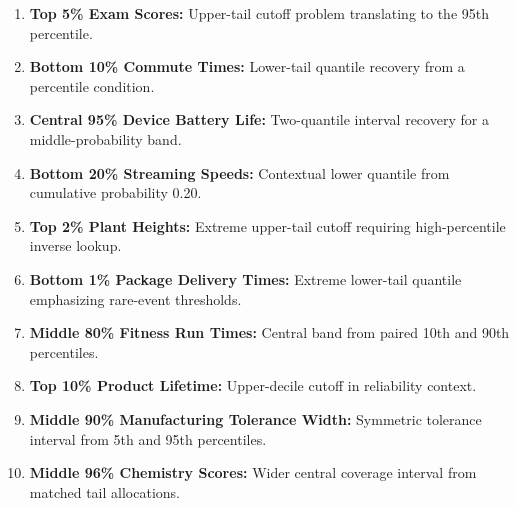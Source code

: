 \begin{enumerate}
  \item \textbf{Top 5\% Exam Scores:} Upper-tail cutoff problem translating to the 95th percentile.
  \item \textbf{Bottom 10\% Commute Times:} Lower-tail quantile recovery from a percentile condition.
  \item \textbf{Central 95\% Device Battery Life:} Two-quantile interval recovery for a middle-probability band.
  \item \textbf{Bottom 20\% Streaming Speeds:} Contextual lower quantile from cumulative probability 0.20.
  \item \textbf{Top 2\% Plant Heights:} Extreme upper-tail cutoff requiring high-percentile inverse lookup.
  \item \textbf{Bottom 1\% Package Delivery Times:} Extreme lower-tail quantile emphasizing rare-event thresholds.
  \item \textbf{Middle 80\% Fitness Run Times:} Central band from paired 10th and 90th percentiles.
  \item \textbf{Top 10\% Product Lifetime:} Upper-decile cutoff in reliability context.
  \item \textbf{Middle 90\% Manufacturing Tolerance Width:} Symmetric tolerance interval from 5th and 95th percentiles.
  \item \textbf{Middle 96\% Chemistry Scores:} Wider central coverage interval from matched tail allocations.
\end{enumerate}


